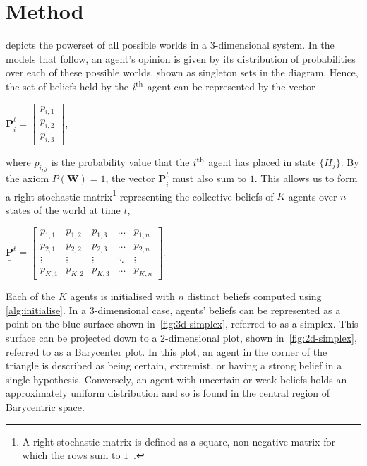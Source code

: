 \chapter{Method}\label{sect:method}

 depicts the powerset of all possible worlds in a $3$-dimensional system. In the models that follow, an agent's opinion is given by its distribution of probabilities over each of these possible worlds, shown as singleton sets in the diagram. Hence, the set of beliefs held by the $i^\textnormal{th}$ agent can be represented by the vector

\begin{center}
$ \underline{\mathbf{P}}^t_i = \begin{bmatrix}
    p_{i, 1}\\
    p_{i, 2}\\
    p_{i, 3}
\end{bmatrix}$,
\end{center}

where $p_{i,j}$ is the probability value that the $i^\textnormal{th}$ agent has placed in state $\{H_j\}$. By the axiom $P(\mathbf{W}) = 1$, the vector $\underline{\mathbf{P}}^t_i$ must also sum to $1$. This allows us to form a right-stochastic matrix\footnote{A right stochastic matrix is defined as a square, non-negative matrix for which the rows sum to $1$~\cite{Gagniuc2017MarkovExperimentation}.} representing the collective beliefs of $K$ agents over $n$ states of the world at time $t$,

\begin{center}
$\underline{\underline{\mathbf{P}}}^t = \begin{bmatrix}
    p_{1, 1} & p_{1, 2} & p_{1, 3} & \dots  & p_{1, n} \\
    p_{2, 1} & p_{2, 2} & p_{2, 3} & \dots  & p_{2, n} \\
    \vdots & \vdots & \vdots & \ddots & \vdots \\
    p_{K, 1} & p_{K, 2} & p_{K, 3} & \dots  & p_{K, n}
\end{bmatrix}$.
\end{center}

Each of the $K$ agents is initialised with $n$ distinct beliefs computed using \cref{alg:initialise}. In a $3$-dimensional case, agents' beliefs can be represented as a point on the blue surface shown in~\cref{fig:3d-simplex}, referred to as a simplex. This surface can be projected down to a $2$-dimensional plot, shown in~\cref{fig:2d-simplex}, referred to as a Barycenter plot. In this plot, an agent in the corner of the triangle is described as being certain, extremist, or having a strong belief in a single hypothesis. Conversely, an agent with uncertain or weak beliefs holds an approximately uniform distribution and so is found in the central region of Barycentric space.

